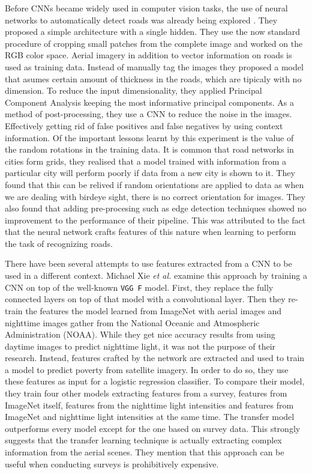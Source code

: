 Before CNNs became widely used in computer vision tasks, the use of neural networks to automatically detect roads was already being explored \cite{Mnih:2010:LDR:1888212.1888230}. They proposed a simple architecture with a single hidden. They use the now standard procedure of cropping small patches from the complete image and worked on the RGB color space. Aerial imagery in addition to vector information on roads is used as training data. Instead of manually tag the images they proposed a model that asumes certain amount of thickness in the roads, which are tipicaly with no dimension. To reduce the input dimensionality, they applied Principal Component Analysis keeping the most informative principal components. As a method of post-processing, they use a CNN to reduce the noise in the images. Effectively getting rid of false positives and false negatives by using context information. Of the important lessons learnt by this experiment is the value of the random rotations in the training data. It is common that road networks in cities form grids, they realised that a model trained with information from a particular city will perform poorly if data from a new city is shown to it. They found that this can be relived if random orientations are applied to data as when we are dealing with birdeye sight, there is no correct orientation for images. They also found that adding pre-procesing such as edge detection techniques showed no improvement to the performance of their pipeline. This was attributed to the fact that the neural network crafts features of this nature when learning to perform the task of recognizing roads.

There have been several attempts to use features extracted from a CNN to be used in a different context. Michael Xie \textit{et al.} \cite{DBLP:journals/corr/XieJBLE15} examine this approach by training a CNN on top of the well-known \texttt{VGG F} model. First, they replace the fully connected layers on top of that model with a convolutional layer. Then they re-train the features the model learned from ImageNet with aerial images and nighttime images gather from the National Oceanic and Atmospheric Administration (NOAA). While they get nice accuracy results from using daytime images to predict nighttime light, it was not the purpose of their research. Instead, features crafted by the network are extracted and used to train a model to predict poverty from satellite imagery. In order to do so, they use these features as input for a logistic regression classifier. To compare their model, they train four other models extracting features from a survey, features from ImageNet itself, features from the nighttime light intensities and features from ImageNet and nighttime light intensities at the same time. The transfer model outperforms every model except for the one based on survey data. This strongly suggests that the transfer learning technique is actually extracting complex information from the aerial scenes. They mention that this approach can be useful when conducting surveys is prohibitively expensive.

